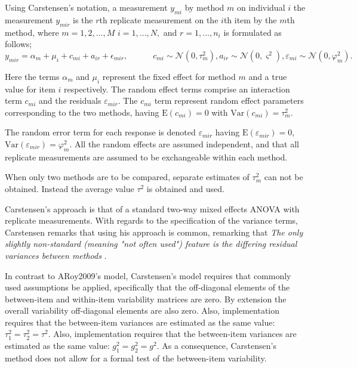 \documentclass[12pt, a4paper]{report}
\theoremstyle{plain}
\theoremstyle{definition}
\theoremstyle{remark}
\begin{document}
	Using Carstensen's notation, a measurement $y_{mi}$ by method $m$ on individual $i$ the measurement $y_{mir} $ is the $r$th replicate measurement on the $i$th item by the $m$th method, where $m=1,2,\ldots,M$ $i=1,\ldots,N,$ and $r = 1,\ldots,n_i$ is formulated as follows;
	\begin{equation}
	y_{mir}  = \alpha_{m} + \mu_{i} + c_{mi} + a_{ir} + \epsilon_{mir}, \qquad \quad c_{mi} \sim \mathcal{N}(0,\tau^{2}_{m}) , a_{ir} \sim \mathcal{N}(0,\varsigma^{2}),  \varepsilon_{mi} \sim \mathcal{N}(0,\varphi^{2}_{m}) .
	\end{equation}
	
	Here the terms $\alpha_{m}$ and $\mu_{i}$ represent the fixed effect for method $m$ and a true value for item $i$ respectively. The random effect terms comprise an interaction term $c_{mi}$ and the residuals $\varepsilon_{mir}$.
	The $c_{mi}$ term represent random effect parameters corresponding to the two methods, having $\mathrm{E}(c_{mi})= 0$ with $\mathrm{Var}(c_{mi})=\tau^2_m$.  
	
	
	The random error term for each response is denoted $\varepsilon_{mir}$ having $\mathrm{E}(\varepsilon_{mir})=0$, $\mathrm{Var}(\varepsilon_{mir})=\varphi^2_m$. All the random effects are assumed independent, and that all replicate measurements are assumed to be exchangeable within each method.
	
	
	When only two methods are to be compared, separate estimates of $\tau^2_m$ can not be obtained. Instead the average value $\tau^2$ is obtained and used.
	
	
	Carstensen's approach is that of a standard two-way mixed effects ANOVA with replicate measurements. With regards to the specification of the variance terms, Carstensen remarks that using his approach is common, remarking that \emph{
		The only slightly non-standard (meaning "not often used") feature is the differing residual variances between methods }\citep{BXC2010}.
	
	In contrast to ARoy2009's model, Carstensen's model requires that commonly used assumptions be applied, specifically that the off-diagonal elements of the between-item and within-item variability matrices are zero. By
	extension the overall variability off-diagonal elements are also zero. Also, implementation requires that the between-item variances are estimated as the same value: $\tau^2_1 = \tau^2_2 = \tau^2$.
	Also, implementation requires that the between-item variances are estimated as the same value: $g^2_1 = g^2_2 = g^2$.
	As a consequence, Carstensen's method does not allow for a formal test of the between-item variability.
	
\end{document}
